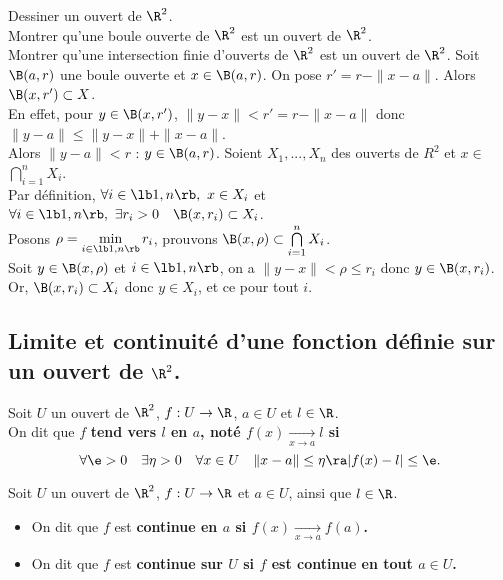 \documentclass[11pt]{article}
\begin{document}
\begin{ex}{}{}
    Dessiner un ouvert de $\R^2$.\\
    Montrer qu'une boule ouverte de $\R^2$ est un ouvert de $\R^2$.\\
    Montrer qu'une intersection finie d'ouverts de $\R^2$ est un ouvert de $\R^2$.
    \tcblower
    Soit $\B(a,r)$ une boule ouverte et $x\in\B(a,r)$. On pose $r'=r-\|x-a\|$. Alors $\B(x,r')\subset X$.\\
    En effet, pour $y\in \B(x,r')$, $\|y-x\|<r'=r-\|x-a\|$ donc $\|y-a\|\leq\|y-x\|+\|x-a\|$.\\
    Alors $\|y-a\| < r$ : $y\in\B(a,r)$.\n
    Soient $X_1,...,X_n$ des ouverts de $R^2$ et $x\in$\large$\bigcap\limits_{i=1}^nX_i$\normalsize.\\
    Par définition, $\forall i\in\lb1,n\rb,~x\in X_i$ et $\forall i \in \lb1,n\rb,~\exists r_i>0\quad \B(x,r_i)\subset X_i$.\\
    Posons $\rho=\min\limits_{i\in\lb 1,n\rb}r_i$, prouvons \large$\B(x,\rho)\subset\bigcap\limits_{i=1}^nX_i$.\normalsize\\
    Soit $y\in\B(x,\rho)$ et $i\in\lb1,n\rb$, on a $\|y-x\|<\rho\leq r_i$ donc $y\in\B(x,r_i)$.\\
    Or, $\B(x,r_i)\subset X_i$ donc $y\in X_i$, et ce pour tout $i$.
\end{ex}

\subsection{Limite et continuité d'une fonction définie sur un ouvert de \texorpdfstring{$\R^2$}{Lg}.}

\begin{defi}{}{}
    Soit $U$ un ouvert de $\R^2$, $f:U\to\R$, $a\in U$ et $l\in \R$.\\
    On dit que $f$ \bf{tend vers} $l$ en $a$, noté $f(x)\xrightarrow[x\to a]{}l$ si
    \begin{equation*}
        \forall \e>0 \quad \exists \eta > 0 \quad \forall x \in U \quad \|x-a\|\leq \eta \ra |f(x)-l|\leq \e.
    \end{equation*}
\end{defi}

\begin{defi}{}{}
    Soit $U$ un ouvert de $\R^2$, $f:U\to \R$ et $a\in U$, ainsi que $l\in\R$.
    \begin{itemize}[topsep=0pt,itemsep=-0.9 ex]
        \item On dit que $f$ est \bf{continue en} $a$ si $f(x)\xrightarrow[x\to a]{}f(a)$.
        \item On dit que $f$ est \bf{continue sur} $U$ si $f$ est continue en tout $a\in U$.
    \end{itemize}
\end{defi} 
\end{document}
